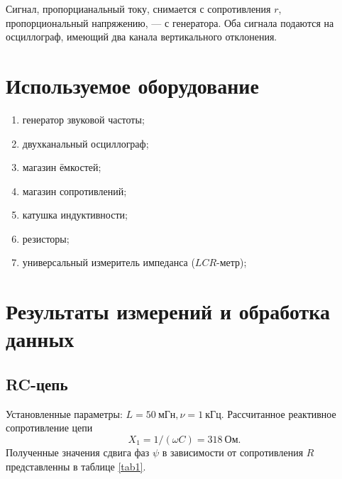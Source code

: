 \documentclass[a4paper, 12pt]{article}
\begin{document}
Сигнал, пропорцианальный току, снимается с сопротивления $r$, пропорциональный напряжению, --- с генератора. Оба сигнала подаются на осциллограф, имеющий два канала вертикального отклонения.

\section{Используемое оборудование}

\begin{enumerate}
    \item генератор звуковой частоты;
    \item двухканальный осциллограф;
    \item магазин ёмкостей;
    \item магазин сопротивлений;
    \item катушка индуктивности;
    \item резисторы;
    \item универсальный измеритель импеданса ($LCR$-метр);
\end{enumerate}

\section{Результаты измерений и обработка данных}

\subsection{RC-цепь}

Установленные параметры: $L = 50~мГн, \nu = 1~кГц$. Рассчитанное реактивное сопротивление цепи $$X_1 = 1/(\omega C) = 318~Ом.$$ Полученные значения сдвига фаз $\psi$ в зависимости от сопротивления $R$ представленны в таблице \ref{tab1}.
\end{document}
